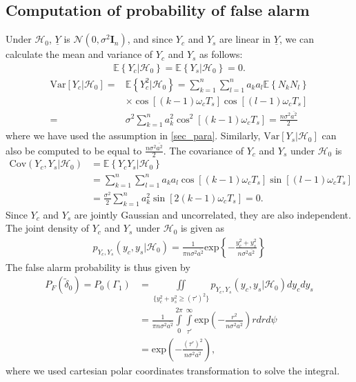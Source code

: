 \documentclass[12pt]{report}
\begin{document}
	\subsection{Computation of probability of false alarm}
	Under $\mathcal{H}_0$, $\underline{Y}$ is $\mathcal{N}(0, \sigma^2\textbf{I}_n)$, and since $Y_c$ and $Y_s$ are linear in $\underline{Y}$, we can calculate the mean 
	and variance of $Y_c$ and $Y_s$ as follows:
	\begin{align}
	 \mathbb{E}\left\{Y_c | \mathcal{H}_0\right\} = \mathbb{E}\left\{Y_s | \mathcal{H}_0\right\} = 0.
	\end{align}
	\begin{align}
	 \text{Var}\left[Y_c | \mathcal{H}_0\right] = &\mathbb{E}\left\{Y_c^2 | \mathcal{H}_0\right\} = \sum_{k=1}^n \sum_{l=1}^n a_k a_l \mathbb{E}\left\{N_k N_l\right\}\nonumber\\
	 & \times \cos\left[\left(k-1\right)\omega_c T_s\right] \cos\left[\left(l-1\right)\omega_c T_s\right] \nonumber\\
	 = &\sigma^2 \sum_{k=1}^n a_k^2 \cos^2\left[\left(k-1\right)\omega_c T_s\right] = \frac{n\sigma^2 \overline{a^2}}{2}
	\end{align}
	where we have used the assumption in \eqref{sec_para}. Similarly, $\text{Var}\left[Y_s | \mathcal{H}_0\right]$ can also be computed to be equal to $\frac{n\sigma^2 \overline{a^2}}{2}$.
	The covariance of $Y_c$ and $Y_s$ under $\mathcal{H}_0 $ is
	\begin{align}
	 \text{Cov}\left(Y_c, Y_s | \mathcal{H}_0\right) &= \mathbb{E}\left\{Y_c Y_s | \mathcal{H}_0\right\} \nonumber\\
	 &= \sum_{k=1}^n \sum_{l=1}^n a_k a_l \cos\left[\left(k-1\right)\omega_c T_s\right] \sin\left[\left(l-1\right)\omega_c T_s\right] \nonumber\\
	 &= \frac{\sigma^2}{2} \sum_{k=1}^n a_k^2 \sin\left[2\left(k-1\right) \omega_c T_s\right] = 0.
	\end{align}
	Since $Y_c$ and $Y_s$ are jointly Gaussian and uncorrelated, they are also independent. The joint density of $Y_c$ and $Y_s$ under $\mathcal{H}_0$ is given as
	\begin{align}
	 p_{Y_c, Y_s}\left(y_c, y_s | \mathcal{H}_0\right) = \frac{1}{\pi n \sigma^2 \overline{a^2}} \text{exp}{\left\{-\frac{y_c^2 + y_s^2}{n\sigma^2\overline{a^2}}\right\}} \label{jpdfYcYs_H0}
	\end{align}
	The false alarm probability is thus given by
	\begin{align}
	 P_F(\tilde{\delta}_0) = P_0\left(\Gamma_1\right) &= \iint\limits_{\{y_c^2 + y_s^2 \ge (\tau')^2\}} p_{Y_c, Y_s}\left(y_c, y_s | \mathcal{H}_0\right) dy_c dy_s \nonumber\\
	 &= \frac{1}{\pi n \sigma^2 \overline{a^2}} \int\limits_{0}^{2 \pi} \int\limits_{\tau'}^{\infty} \text{exp}\left(-\frac{r^2}{n \sigma^2 \overline{a^2}}\right) rdr d\psi \nonumber\\
	 &= \text{exp}\left(-\frac{(\tau')^2}{n \sigma^2 \overline{a^2}}\right), \label{FalseAlarmProb}
	\end{align}
	where we used cartesian polar coordinates transformation to solve the integral.
       
\end{document}

